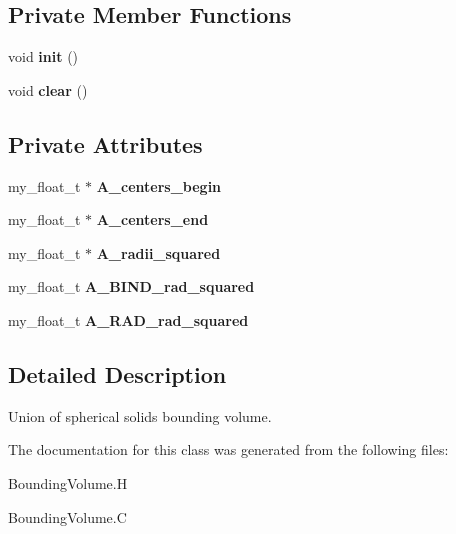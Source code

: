 \subsection*{Private Member Functions}
\begin{CompactItemize}
\item 
void \textbf{init} ()\label{classASCbase_1_1UnionOfBalls_a98c168b667d7298c29037933b10b922}

\item 
void \textbf{clear} ()\label{classASCbase_1_1UnionOfBalls_e6fcd15076dd64afce01a77027ee1ef9}

\end{CompactItemize}
\subsection*{Private Attributes}
\begin{CompactItemize}
\item 
my\_\-float\_\-t $\ast$ \textbf{A\_\-centers\_\-begin}\label{classASCbase_1_1UnionOfBalls_5bc57d328307b5bd8599468bc102c974}

\item 
my\_\-float\_\-t $\ast$ \textbf{A\_\-centers\_\-end}\label{classASCbase_1_1UnionOfBalls_45abbdda1436d8cf9a6307475e1f981e}

\item 
my\_\-float\_\-t $\ast$ \textbf{A\_\-radii\_\-squared}\label{classASCbase_1_1UnionOfBalls_483337996767271d2a28f3142abed396}

\item 
my\_\-float\_\-t \textbf{A\_\-BIND\_\-rad\_\-squared}\label{classASCbase_1_1UnionOfBalls_70cef8b0e9a4fb07652d525127589a33}

\item 
my\_\-float\_\-t \textbf{A\_\-RAD\_\-rad\_\-squared}\label{classASCbase_1_1UnionOfBalls_0e1c4804bf021db5e7f641e9316a6226}

\end{CompactItemize}


\subsection{Detailed Description}
Union of spherical solids bounding volume. 



The documentation for this class was generated from the following files:\begin{CompactItemize}
\item 
Bounding\-Volume.H\item 
Bounding\-Volume.C\end{CompactItemize}
